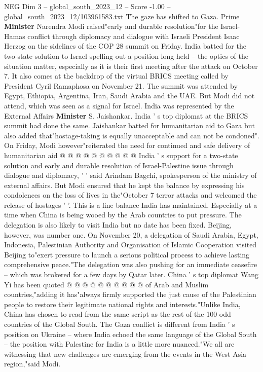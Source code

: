 \begin{textsample}{NEG Dim 3 – global\_south\_2023\_12 – Score -1.00 – global\_south\_2023\_12/103961583.txt}  \label{ex:f3_neg_033}
The gaze has shifted to Gaza.
Prime \textbf{Minister} Narendra Modi raised"early and durable resolution"for the Israel-Hamas conflict through diplomacy and dialogue with Israeli President Isaac Herzog on the sidelines of the COP 28 summit on Friday.
India batted for the two-state solution to Israel spelling out a position long held -- the optics of the situation matter, especially as it is their first meeting after the attack on October 7.
It also comes at the backdrop of the virtual BRICS meeting called by President Cyril Ramaphosa on November 21.
The summit was attended by Egypt, Ethiopia, Argentina, Iran, Saudi Arabia and the UAE.
But Modi did not attend, which was seen as a signal for Israel.
India was represented by the External Affairs \textbf{Minister} S.
Jaishankar.
India ' s top diplomat at the BRICS summit had done the same.
Jaishankar batted for humanitarian aid to Gaza but also added that"hostage-taking is equally unacceptable and can not be condoned".
On Friday, Modi however"reiterated the need for continued and safe delivery of humanitarian aid @ @ @ @ @ @ @ @ @ @ India ' s support for a two-state solution and early and durable resolution of Israel-Palestine issue through dialogue and diplomacy, ' ' said Arindam Bagchi, spokesperson of the ministry of external affairs.
But Modi ensured that he kept the balance by expressing his condolences on the loss of lives in the"October 7 terror attacks and welcomed the release of hostages ' '.
This is a fine balance India has maintained.
Especially at a time when China is being wooed by the Arab countries to put pressure.
The delegation is also likely to visit India but no date has been fixed.
Beijing, however, was number one.
On November 20, a delegation of Saudi Arabia, Egypt, Indonesia, Palestinian Authority and Organisation of Islamic Cooperation visited Beijing to"exert pressure to launch a serious political process to achieve lasting comprehensive peace."The delegation was also pushing for an immediate ceasefire -- which was brokered for a few days by Qatar later.
China ' s top diplomat Wang Yi has been quoted @ @ @ @ @ @ @ @ @ @ of Arab and Muslim countries,"adding it has"always firmly supported the just cause of the Palestinian people to restore their legitimate national rights and interests."Unlike India, China has chosen to read from the same script as the rest of the 100 odd countries of the Global South.
The Gaza conflict is different from India ' s position on Ukraine -- where India echoed the same language of the Global South -- the position with Palestine for India is a little more nuanced."We all are witnessing that new challenges are emerging from the events in the West Asia region,"said Modi.

\end{textsample}

